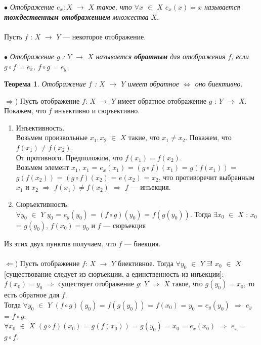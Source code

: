 $\bullet$ \textit{Отображение $e_x : X$ $\rightarrow$ $X$ такое, что $\forall x$ $\in$ $X$ $e_x(x) = x$ называется \textbf{тождественным отображением} множества $X$}.\\\\
Пусть $f$ : $X$ $\rightarrow$ $Y$ --- некоторое отображение. \\\\
$\bullet$ \textit{Отображение $g$ : $Y$ $\rightarrow$ $X$ называется \textbf{обратным} для отображения $f$, если $g \circ f$ = $e_x$, $f \circ g$ = $e_y$.}
\newtheorem*{t6_2_2}{Теорема}\begin{t6_2_2} Отображение $f$ : $X$ $\rightarrow$ $Y$ имеет обратное $\Longleftrightarrow$ оно биективно.
\end{t6_2_2} \begin{Proof} $\Rightarrow$) Пусть отображение $f$: $X$ $\rightarrow$ $Y$ имеет обратное отображение $g$ : $Y$ $\rightarrow$ $X$. Покажем, что $f$ инъективно и сюръективно. \begin{enumerate}
		\item Инъективность.\\ 
		Возьмем произвольные $x_1, x_2$ $\in$ $X$ такие, что $x_1 \not= x_2$. Покажем, что $f(x_1) \not= f(x_2)$.\\
		От противного. Предположим, что $f(x_1) = f(x_2)$.\\
		Возьмем элемент $x_1$, $x_1$ = $e_x(x_1)$ = $(g \circ f)(x_1)$ = $g(f(x_1))$ = $g(f(x_2))$ = $(g \circ f)(x_2)$ = $e(x_2)$ = $x_2$, что противоречит выбранным $x_1$ и $x_2$ $\Rightarrow$ $f(x_1) \not= f(x_2)$ $\Rightarrow$ $f$ --- инъекция.
		\item Сюръективность.\\ 
		$\forall y_0$ $\in$ $Y$ $y_0$ = $e_y$$(y_0)$ = $(f \circ g)(y_0)$ = $f(g(y_0))$. Тогда $\exists x_0$ $\in$ $X$ : $x_0$= $g(y_0)$, $f(x_0) = y_0$ и $f$ --- сюръекция
	\end{enumerate}
	Из этих двух пунктов получаем, что $f$ --- биекция.\\\\
	$\Leftarrow$) Пусть отображение $f$: $X$ $\rightarrow$ $Y$ биективное. Тогда $\forall$$y_0$ $\in$ $Y$ $\exists$$!$ $x_0$ $\in$ $X$  [существование следует из сюръекции, а единственность из инъекции]: $f(x_0) = y_0$ $\Rightarrow$ существует отображение $g$: $Y$ $\Rightarrow$ $X$ такое, что $g(y_0) = x_0$, то есть обратное для $f$. \\
	Тогда $\forall$$y_0$ $\in$ $Y$ $(f \circ g)(y_0)$ = $f(g(y_0))$ = $f(x_0)$ = $y_0$ = $e_y(y_0)$ $\Rightarrow$ $e_y$ = $f \circ g$. \\
	$\forall$$x_0$ $\in$ $X$ $(g \circ f)(x_0)$ = $g(f(x_0))$ = $g(y_0)$ = $x_0$ = $e_x(x_0)$ $\Rightarrow$ $e_x$ = $g \circ f$.
\end{Proof} \\
